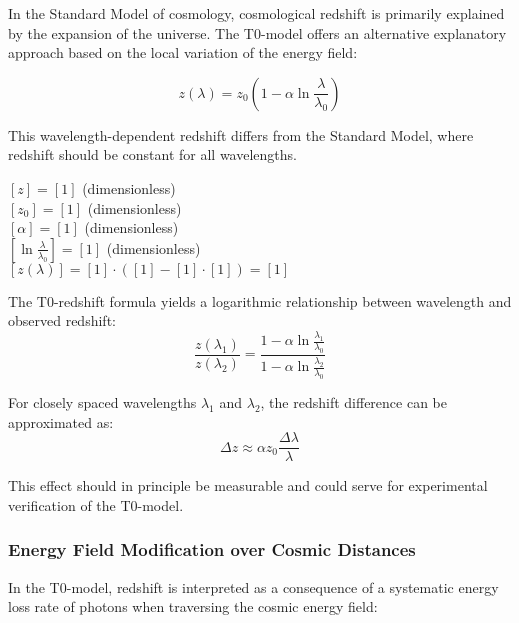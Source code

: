 \documentclass[12pt,a4paper]{article}
\theoremstyle{definition}
\begin{document}
	In the Standard Model of cosmology, cosmological redshift is primarily explained by the expansion of the universe. The T0-model offers an alternative explanatory approach based on the local variation of the energy field:
	
	\begin{equation}
		\boxed{z(\lambda) = z_0\left(1 - \alpha \ln\frac{\lambda}{\lambda_0}\right)}
	\end{equation}
	
	This wavelength-dependent redshift differs from the Standard Model, where redshift should be constant for all wavelengths.
	
	\begin{einheitencheck}
		$[z] = [1]$ (dimensionless)\\
		$[z_0] = [1]$ (dimensionless)\\
		$[\alpha] = [1]$ (dimensionless)\\
		$[\ln\frac{\lambda}{\lambda_0}] = [1]$ (dimensionless)\\
		$[z(\lambda)] = [1] \cdot ([1] - [1] \cdot [1]) = [1]$ \checkmark
	\end{einheitencheck}
	
	\begin{verhaltnis}
		The T0-redshift formula yields a logarithmic relationship between wavelength and observed redshift:
		\begin{equation}
			\frac{z(\lambda_1)}{z(\lambda_2)} = \frac{1 - \alpha \ln\frac{\lambda_1}{\lambda_0}}{1 - \alpha \ln\frac{\lambda_2}{\lambda_0}}
		\end{equation}
		
		For closely spaced wavelengths $\lambda_1$ and $\lambda_2$, the redshift difference can be approximated as:
		\begin{equation}
			\Delta z \approx \alpha z_0 \frac{\Delta\lambda}{\lambda}
		\end{equation}
		
		This effect should in principle be measurable and could serve for experimental verification of the T0-model.
	\end{verhaltnis}
	
	\subsubsection{Energy Field Modification over Cosmic Distances}
	
	In the T0-model, redshift is interpreted as a consequence of a systematic energy loss rate of photons when traversing the cosmic energy field:
	
\end{document}
